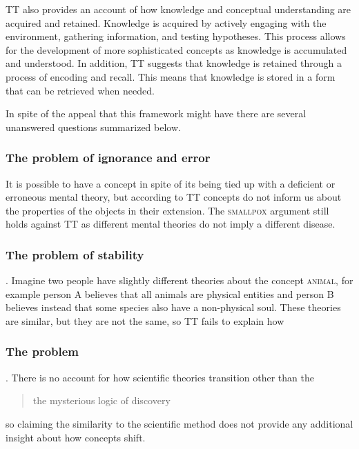 TT also provides an account of how knowledge and conceptual understanding are acquired and retained. Knowledge is acquired by actively engaging with the environment, gathering information, and testing hypotheses. This process allows for the development of more sophisticated concepts as knowledge is accumulated and understood. In addition, TT suggests that knowledge is retained through a process of encoding and recall. This means that knowledge is stored in a form that can be retrieved when needed.

In spite of the appeal that this framework might have there are several unanswered questions summarized below.

\subsubsection*{The problem of ignorance and error}
It is possible to have a concept in spite of its being tied up with a deficient or erroneous mental theory, but according to TT concepts do not inform us about the properties of the objects in their extension. The \textsc{smallpox} argument still holds against TT as different mental theories do not imply a different disease.

\subsubsection*{The problem of stability}
. Imagine two people have slightly different theories about the concept \textsc{animal}, for example person A believes that all animals are physical entities and person B believes instead that some species also have a non-physical soul. These theories are similar, but they are not the same, so TT fails to explain how 

\subsubsection*{The  problem}
. There is no account for how scientific theories transition other than the \blockcquote[p. 40]{Gopnik1997}{the mysterious logic of discovery} so claiming the similarity to the scientific method does not provide any additional insight about how concepts shift.

